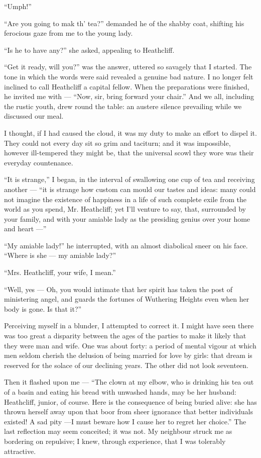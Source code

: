 \par “Umph!”
\par “Are you going to mak th' tea?” demanded he of the shabby coat, shifting his ferocious gaze from me to the young lady.
\par “Is he to have any?” she asked, appealing to Heathcliff.
\par “Get it ready, will you?” was the answer, uttered so savagely that I started. The tone in which the words were said revealed a genuine bad nature. I no longer felt inclined to call Heathcliff a capital fellow. When the preparations were finished, he invited me with — “Now, sir, bring forward your chair.” And we all, including the rustic youth, drew round the table: an austere silence prevailing while we discussed our meal.
\par I thought, if I had caused the cloud, it was my duty to make an effort to dispel it. They could not every day sit so grim and taciturn; and it was impossible, however ill-tempered they might be, that the universal scowl they wore was their everyday countenance.
\par “It is strange,” I began, in the interval of swallowing one cup of tea and receiving another — “it is strange how custom can mould our tastes and ideas: many could not imagine the existence of happiness in a life of such complete exile from the world as you spend, Mr. Heathcliff; yet I'll venture to say, that, surrounded by your family, and with your amiable lady as the presiding genius over your home and heart —”
\par “My amiable lady!” he interrupted, with an almost diabolical sneer on his face. “Where is she — my amiable lady?”
\par “Mrs. Heathcliff, your wife, I mean.”
\par “Well, yes — Oh, you would intimate that her spirit has taken the post of ministering angel, and guards the fortunes of Wuthering Heights even when her body is gone. Is that it?”
\par Perceiving myself in a blunder, I attempted to correct it. I might have seen there was too great a disparity between the ages of the parties to make it likely that they were man and wife. One was about forty: a period of mental vigour at which men seldom cherish the delusion of being married for love by girls: that dream is reserved for the solace of our declining years. The other did not look seventeen.
\par Then it flashed upon me — “The clown at my elbow, who is drinking his tea out of a basin and eating his bread with unwashed hands, may be her husband: Heathcliff, junior, of course. Here is the consequence of being buried alive: she has thrown herself away upon that boor from sheer ignorance that better individuals existed! A sad pity —I must beware how I cause her to regret her choice.” The last reflection may seem conceited; it was not. My neighbour struck me as bordering on repulsive; I knew, through experience, that I was tolerably attractive.
